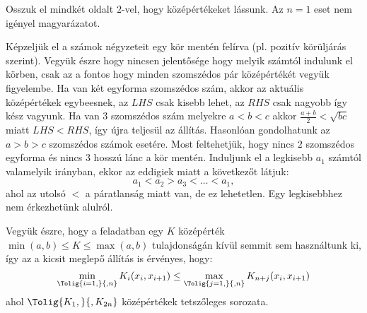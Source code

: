 \par Osszuk el mindkét oldalt $2$-vel, hogy középértékeket lássunk.
Az $n=1$ eset nem igényel magyarázatot. 
\par Képzeljük el a számok négyzeteit egy kör mentén felírva (pl. pozitív körüljárás szerint). 
Vegyük észre hogy nincsen jelentősége hogy melyik számtól indulunk el körben, csak az a fontos 
hogy minden szomszédos pár középértékét vegyük figyelembe.
Ha van két egyforma szomszédos szám, akkor az aktuális középértékek 
egybeesnek, az $LHS$ csak kisebb lehet, az $RHS$ 
csak nagyobb így kész vagyunk. Ha van $3$ szomszédos szám melyekre 
$a<b<c$ akkor $\frac{a+b}{2}<\sqrt{bc}$ miatt $LHS<RHS$,  így újra teljesül az állítás. 
Hasonlóan gondolhatunk az $a>b>c$ szomszédos számok esetére. Most feltehetjük, hogy nincs 
$2$ szomszédos egyforma  és nincs $3$ hosszú lánc a kör mentén. Induljunk el a legkisebb 
$a_1$ számtól valamelyik irányban, ekkor az eddigiek miatt a következőt látjuk:
$$
a_{1}< a_{2} > a_{3} < \hdots < a_{1}, 
$$
ahol az utolsó $<$ a páratlanság miatt van, de ez lehetetlen. Egy legkisebbhez 
nem érkezhetünk alulról.
\par Vegyük észre, hogy a feladatban egy $K$ középérték 
$\min(a,b)\le K \le \max(a,b)$ tulajdonságán kívül semmit sem használtunk ki, 
így az a kicsit meglepő állítás is érvényes, hogy:
$$
\min_{\Tolig{i=1,}{,n}} K_{i}(x_{i},x_{i+1}) \le
\max_{\Tolig{j=1,}{,n}} K_{n+j}(x_{i},x_{i+1})
$$
ahol $\Tolig{K_{1},}{,K_{2n}}$ középértékek tetszőleges sorozata.


